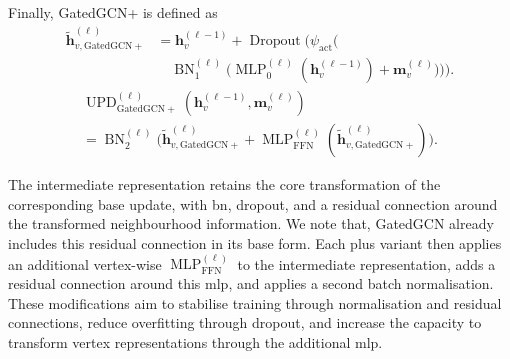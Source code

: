 Finally, GatedGCN+ is defined as
\begin{equation}
\label{eq:ch07:gated-plus-propagation}
\begin{split}
    \widetilde{\mathbf h}_{v,\mathrm{GatedGCN+}}^{(\ell)}
        &=\mathbf{h}_v^{(\ell-1)}+\operatorname{Dropout}\bigl(\psi_{\mathrm{act}}\bigl(\\
        &\quad\operatorname{BN}_1^{(\ell)}\bigl(\operatorname{MLP}_0^{(\ell)}(\mathbf{h}_v^{(\ell-1)})+\mathbf{m}_v^{(\ell)}\bigr)\bigr)\bigr).
\end{split}
\end{equation}
\begin{equation}
\label{eq:ch07:gated-plus-update}
\begin{gathered}
    \operatorname{UPD}_{\mathrm{GatedGCN+}}^{(\ell)}\!\left(\mathbf{h}_v^{(\ell-1)},\mathbf{m}_v^{(\ell)}\right)\\
        =\operatorname{BN}_2^{(\ell)}\bigl(\widetilde{\mathbf h}_{v,\mathrm{GatedGCN+}}^{(\ell)}+\operatorname{MLP}_{\mathrm{FFN}}^{(\ell)}(\widetilde{\mathbf h}_{v,\mathrm{GatedGCN+}}^{(\ell)})\bigr).
\end{gathered}
\end{equation}

The intermediate representation retains the core transformation of the corresponding base update, with \gls{bn}, dropout, and a residual connection around the transformed neighbourhood information. We note that, GatedGCN already includes this residual connection in its base form.
Each plus variant then applies an additional vertex-wise $\operatorname{MLP}_{\mathrm{FFN}}^{(\ell)}$ to the intermediate representation, adds a residual connection around this \gls{mlp}, and applies a second batch normalisation. These modifications aim to stabilise training through normalisation and residual connections, reduce overfitting through dropout, and increase the capacity to transform vertex representations through the additional \gls{mlp}.

